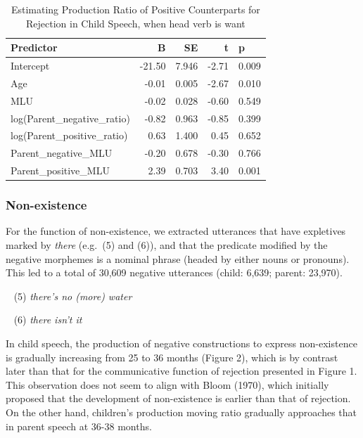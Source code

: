 \documentclass[
  english,
  man,floatsintext]{apa6}
\begin{document}
\begin{table}

\caption{\label{tab:unnamed-chunk-2}Estimating Production Ratio of Positive Counterparts for Rejection in Child Speech, when head verb is want}
\centering
\begin{tabular}[t]{l|r|r|r|l}
\hline
Predictor & B & SE & t & p\\
\hline
Intercept & -21.50 & 7.946 & -2.71 & 0.009\\
\hline
Age & -0.01 & 0.005 & -2.67 & 0.010\\
\hline
MLU & -0.02 & 0.028 & -0.60 & 0.549\\
\hline
log(Parent\_negative\_ratio) & -0.82 & 0.963 & -0.85 & 0.399\\
\hline
log(Parent\_positive\_ratio) & 0.63 & 1.400 & 0.45 & 0.652\\
\hline
Parent\_negative\_MLU & -0.20 & 0.678 & -0.30 & 0.766\\
\hline
Parent\_positive\_MLU & 2.39 & 0.703 & 3.40 & 0.001\\
\hline
\end{tabular}
\end{table}

\clearpage

\hypertarget{non-existence}{%
\subsubsection{Non-existence}\label{non-existence}}

For the function of non-existence, we extracted utterances that have expletives marked by \emph{there} (e.g.~(5) and (6)), and that the predicate modified by the negative morphemes is a nominal phrase (headed by either nouns or pronouns). This led to a total of 30,609 negative utterances (child: 6,639; parent: 23,970).

~
(5) \emph{there's no (more) water}

~
(6) \emph{there isn't it}

In child speech, the production of negative constructions to express non-existence is gradually increasing from 25 to 36 months (Figure 2), which is by contrast later than that for the communicative function of rejection presented in Figure 1. This observation does not seem to align with Bloom (1970), which initially proposed that the development of non-existence is earlier than that of rejection. On the other hand, children's production moving ratio gradually approaches that in parent speech at 36-38 months.
\end{document}
